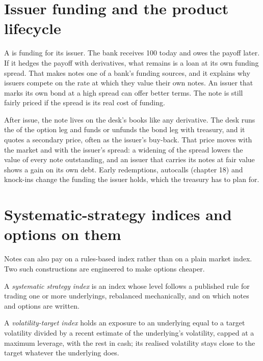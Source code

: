 \section{Issuer funding and the product lifecycle}

A  is funding for its issuer. The bank receives 100 today and owes the payoff later. If it hedges the payoff with
derivatives, what remains is a loan at its own funding spread. That makes notes one of a bank's funding sources, and it explains why
issuers compete on the rate at which they value their own notes. An issuer that marks its own bond at a high spread can offer better
terms. The note is still fairly priced if the spread is its real cost of funding.

After issue, the note lives on the desk's books like any derivative. The desk runs the  of the option leg and funds or unfunds the
bond leg with treasury, and it quotes a secondary price, often as the issuer's buy-back. That price moves with the market and with the
issuer's spread: a widening of the spread lowers the value of every note outstanding, and an issuer that carries its notes at fair value
shows a gain on its own debt. Early redemptions, autocalls (chapter 18) and knock-ins change the funding the issuer holds, which the treasury has to plan for.

\section{Systematic-strategy indices and options on them}

Notes can also pay on a rules-based index rather than on a plain market index. Two such constructions are engineered to make options
cheaper.

\begin{definition}\label{def:dv:the-structured-products-business:ssi}
A \emph{systematic strategy index} is an index whose level follows a published rule for trading one or
more underlyings, rebalanced mechanically, and on which notes and options are written.
\end{definition}

\begin{definition}\label{def:dv:the-structured-products-business:vt}
A \emph{volatility-target index} holds an exposure to an underlying equal to a target volatility divided
by a recent estimate of the underlying's volatility, capped at a maximum leverage, with the rest in cash; its realised volatility stays
close to the target whatever the underlying does.
\end{definition}

